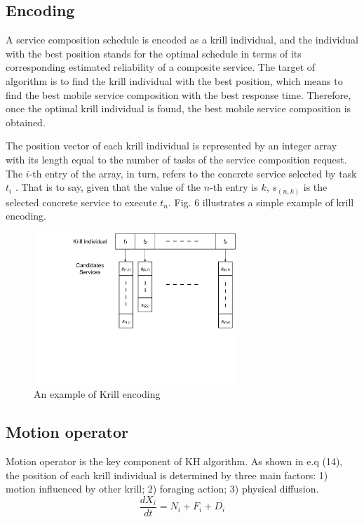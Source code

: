 \documentclass[journal]{IEEEtran}
\begin{document}
\subsection{Encoding}
A service composition schedule is encoded as a krill individual, and the individual with the best position stands for the optimal schedule in terms of its corresponding estimated reliability of a composite service. The target of algorithm is to find the krill individual with the best position, which means to find the best mobile service composition with the best response time. Therefore, once the optimal krill individual is found, the best mobile service composition is obtained.

The position vector of each krill individual is represented by an integer array with its length equal to the number of tasks of the service composition request. The $i$-th entry of the array, in turn, refers to the concrete service selected by task $t_i$ . That is to say, given that the value of the $n$-th entry is $k$, $s_{(n,k)}$ is the selected concrete service to execute $t_n$. Fig. 6 illustrates a simple example of  krill encoding.

\begin{figure}[!t]
\centering
\includegraphics[width=3in]{./img/pic4.pdf}
\caption{An example of Krill encoding}
\label{Krill encoding}
\end{figure}


\subsection{Motion operator}
% 
% 

Motion operator is the key component of KH algorithm. As shown in e.q (14), the position of each krill individual is determined by three main factors: 1) motion influenced by other krill; 2) foraging action; 3) physical diffusion. 
\begin{equation}
\frac{dX_i}{dt} =N_i+F_i+D_i
\end{equation}
\end{document}
